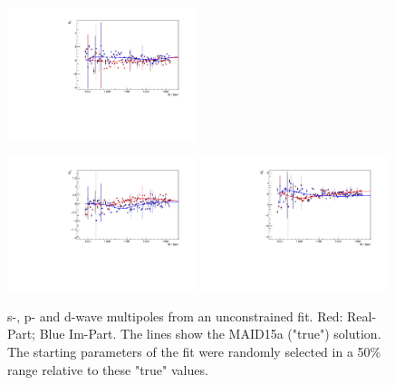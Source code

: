 \documentclass[a4paper,12pt]{report}
\begin{document}
\begin{figure}
\begin{center}
{    \includegraphics[width=0.49\textwidth]{MAID2015a/free/plots.0/E2m.pdf}
    }
    \centerline{
    \includegraphics[width=0.49\textwidth]{MAID2015a/free/plots.0/M2p.pdf}
    \includegraphics[width=0.49\textwidth]{MAID2015a/free/plots.0/M2m.pdf}
    }
    \caption{s-, p- and d-wave multipoles from an unconstrained fit. Red: Real-Part; Blue Im-Part.
    The lines show the MAID15a ("true") solution. The starting parameters of the fit were randomly selected 
    in a 50\% range relative to these "true" values.}
\label{Fig:free1}
  \end{center}
\end{figure}
\end{document}
